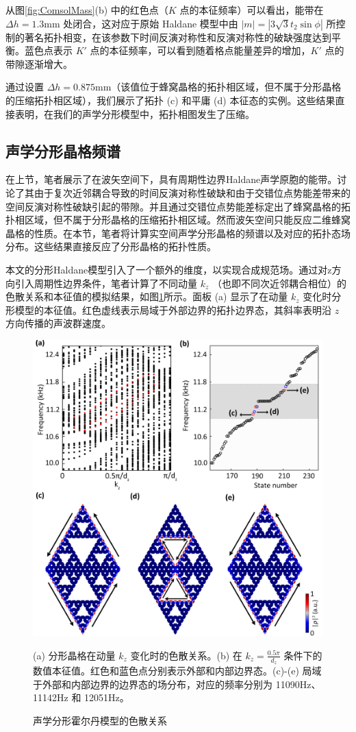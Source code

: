 从图\ref{fig:ComsolMass}(b) 中的红色点（$K$ 点的本征频率）可以看出，能带在 $\Delta h = 1.3$mm 处闭合，这对应于原始 Haldane 模型中由 $|m| = |3\sqrt{3}t_2 \sin\phi|$ 所控制的著名拓扑相变，在该参数下时间反演对称性和反演对称性的破缺强度达到平衡。蓝色点表示 $K'$ 点的本征频率，可以看到随着格点能量差异的增加，$K'$ 点的带隙逐渐增大。

通过设置 $\Delta h = 0.875$mm（该值位于蜂窝晶格的拓扑相区域，但不属于分形晶格的压缩拓扑相区域），我们展示了拓扑 (c) 和平庸 (d) 本征态的实例。这些结果直接表明，在我们的声学分形模型中，拓扑相图发生了压缩。

\subsection{声学分形晶格频谱}
在上节，笔者展示了在波矢空间下，具有周期性边界Haldane声学原胞的能带。讨论了其由于复次近邻耦合导致的时间反演对称性破缺和由于交错位点势能差带来的空间反演对称性破缺引起的带隙。并且通过交错位点势能差标定出了蜂窝晶格的拓扑相区域，但不属于分形晶格的压缩拓扑相区域。然而波矢空间只能反应二维蜂窝晶格的性质。在本节，笔者将计算实空间声学分形晶格的频谱以及对应的拓扑态场分布。这些结果直接反应了分形晶格的拓扑性质。

本文的分形Haldane模型引入了一个额外的维度，以实现合成规范场。通过对z方向引入周期性边界条件，笔者计算了不同动量 $k_z$ （也即不同次近邻耦合相位）的色散关系和本征值的模拟结果，如图\ref{fig:AcouFractSpec}所示。面板 (a) 显示了在动量 $k_z$ 变化时分形模型的本征值。红色虚线表示局域于外部边界的拓扑边界态，其斜率表明沿 $z$ 方向传播的声波群速度。

\begin{figure}[htbp]
    \centering
    \includegraphics[width=0.75\linewidth]{figure/FracHaldExp/AcouFractSpec.png}
    \caption{声学分形霍尔丹模型的色散关系}(a) 分形晶格在动量 $k_z$ 变化时的色散关系。(b) 在 $k_z = \frac{0.5\pi}{d_z}$ 条件下的数值本征值。红色和蓝色点分别表示外部和内部边界态。(c)-(e) 局域于外部和内部边界的边界态的场分布，对应的频率分别为 11090Hz、11142Hz 和 12051Hz。
    \label{fig:AcouFractSpec}
\end{figure}

